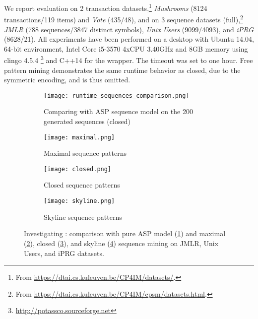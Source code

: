 {We report evaluation on 2 transaction datasets,\!\footnote{From \url{https://dtai.cs.kuleuven.be/CP4IM/datasets/}.} \textit{Mushrooms} (8124 transactions/119 items) and \textit{Vote} (435/48), and on 3 sequence datasets (full),\!\footnote{From \url{https://dtai.cs.kuleuven.be/CP4IM/cpsm/datasets.html}.} \textit{JMLR} (788 sequences/3847 distinct symbols), \textit{Unix Users} (9099/4093), and \textit{iPRG} (8628/21). 
%
All experiments have been performed on a desktop with Ubuntu 14.04, 64-bit environment, Intel Core i5-3570 4xCPU 3.40GHz and 8GB memory using clingo 4.5.4 \footnote{\url{http://potassco.sourceforge.net}}  and C++14 for the wrapper. The timeout was set to one hour. Free pattern mining demonstrates the same runtime behavior as closed, due to the symmetric encoding, and is thus omitted. %
\begin{figure}[tb]
  \centering
  \begin{subfigure}[t]{0.49\textwidth}
   \texttt{[image: runtime\_sequences\_comparison.png]}
   \caption{Comparing with ASP sequence model \parencite{DBLP:conf/ijcai/GebserGQ0S16} on the 200 generated sequences (closed)}
    \label{fig:sequence_comparison}
  \end{subfigure}
 \hfill
  \begin{subfigure}[t]{0.49\textwidth}
   \texttt{[image: maximal.png]}
   \caption{Maximal sequence patterns} %
    \label{fig:maximal}
  \end{subfigure}
 \hfill
  \begin{subfigure}[t]{0.49\textwidth}
   \texttt{[image: closed.png]}
   \caption{Closed sequence patterns} %
    \label{fig:closed}
  \end{subfigure}
\hfill
  \begin{subfigure}[t]{0.49\textwidth}
   \texttt{[image: skyline.png]}
   \caption{Skyline sequence patterns} %
    \label{fig:skyline}
  \end{subfigure}
  \caption{Investigating \qone: comparison with pure ASP model (\ref{fig:sequence_comparison}) and maximal (\ref{fig:maximal}),  closed (\ref{fig:closed}), and skyline (\ref{fig:skyline}) sequence mining on  JMLR, Unix Users, and iPRG datasets.}
  \label{fig:qone}
\end{figure}

}
